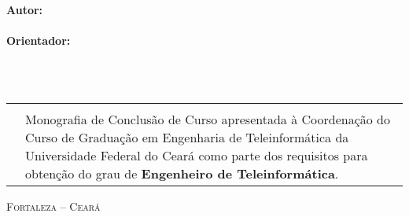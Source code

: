 \thispagestyle{empty}%

\begin{center}
    \null\vfill%
    \vspace{.25cm}%
    {\normalsize    \textbf{Autor:} \\%
                    \upshape{\autor}
                    }\\%

    \null\vfill%
    \vspace{.25cm}%
    {\normalsize    \textbf{Orientador:} \\%
                    \upshape{\orientador}
                    } \\%
    \null\vfill%
    \vspace{.25cm}%

    \vspace{.25cm}%
    {\large         \titulo\\}

    \null\vfill%
    \vspace{.25cm}%
    \begin{tabularx}{\textwidth}{XX}

    \null\vfill \\
    &
    Monografia de Conclus\~{a}o de Curso apresentada \`{a} Coordena\c{c}\~{a}o do Curso de Gradua\c{c}\~{a}o em Engenharia de Teleinform\'{a}tica da Universidade Federal do Cear\'{a} como parte dos requisitos para obten\c{c}\~{a}o do grau de \textbf{Engenheiro de Teleinform\'{a}tica}. \\

    \end{tabularx}

    \null\vfill%
    \vspace{.25cm}%

    {\normalsize    \textsc{Fortaleza -- Cear\'{a} \\%
                            \monthname~\the\year}}
\end{center}
